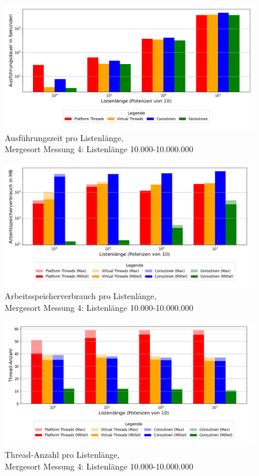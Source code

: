 \documentclass[fontsize=12pt,paper=a4,twoside=semi,parskip=half-,headsepline,headinclude]{scrreprt}
\begin{document}
\begin{figure}[H]
	\centering
	\includegraphics[scale=0.5]{figures/mergesort/Listenlaenge/execution_time_plot.png}
	\caption{Ausführungszeit pro Listenlänge,\\ Mergesort Messung 4: Listenlänge 10.000-10.000.000}
	\label{fig:mslaengeZeit}
\end{figure}

\begin{figure}[H]
	\centering
	\includegraphics[scale=0.5]{figures/mergesort/Listenlaenge/memory_usage_bar_plot.png}
	\caption{Arbeitsspeicherverbrauch pro Listenlänge,\\ Mergesort Messung 4: Listenlänge 10.000-10.000.000}
	\label{fig:mslaengeRAM}
\end{figure}

\begin{figure}[H]
	\centering
	\includegraphics[scale=0.5]{figures/mergesort/Listenlaenge/num_threads_bar_plot.png}
	\caption{Thread-Anzahl pro Listenlänge,\\ Mergesort Messung 4: Listenlänge 10.000-10.000.000}
	\label{fig:mslaengeThreads}
\end{figure}
\end{document}

